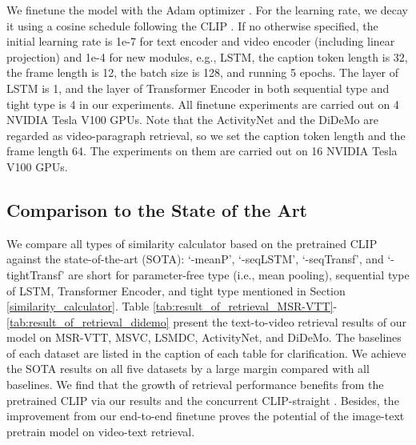 \documentclass[11pt]{article}
\begin{document}
	We finetune the model with the Adam optimizer \cite{kingma2014adam}. For the learning rate, we decay it using a cosine schedule \cite{Loshchilov2017SGDR} following the CLIP \cite{radford2021learning}. If no otherwise specified, the initial learning rate is 1e-7 for text encoder and video encoder (including linear projection) and 1e-4 for new modules, e.g., LSTM, the caption token length is 32, the frame length is 12, the batch size is 128, and running 5 epochs. The layer of LSTM is 1, and the layer of Transformer Encoder in both sequential type and tight type is 4 in our experiments. All finetune experiments are carried out on 4 NVIDIA Tesla V100 GPUs. Note that the ActivityNet and the DiDeMo are regarded as video-paragraph retrieval, so we set the caption token length and the frame length 64. The experiments on them are carried out on 16 NVIDIA Tesla V100 GPUs.

	\subsection{Comparison to the State of the Art}
	We compare all types of similarity calculator based on the pretrained CLIP against the state-of-the-art (SOTA): `-meanP', `-seqLSTM', `-seqTransf', and `-tightTransf' are short for parameter-free type (i.e., mean pooling), sequential type of LSTM, Transformer Encoder, and tight type mentioned in Section \ref{similarity_calculator}. Table \ref{tab:result_of_retrieval_MSR-VTT}-\ref{tab:result_of_retrieval_didemo} present the text-to-video retrieval results of our model on MSR-VTT, MSVC, LSMDC, ActivityNet, and DiDeMo. The baselines of each dataset are listed in the caption of each table for clarification. We achieve the SOTA results on all five datasets by a large margin compared with all baselines. We find that the growth of retrieval performance benefits from the pretrained CLIP via our results and the concurrent CLIP-straight \cite{PortilloQuintero2021}. Besides, the improvement from our end-to-end finetune proves the potential of the image-text pretrain model on video-text retrieval.
\end{document}
